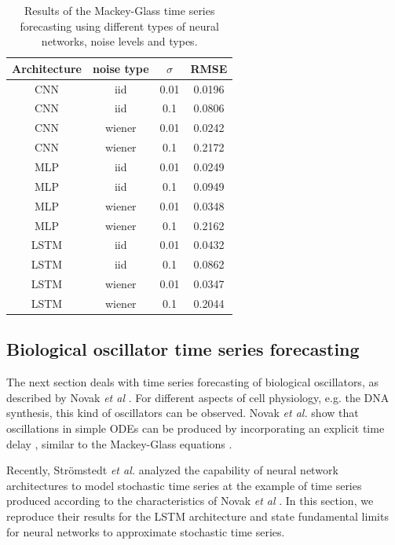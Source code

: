 \documentclass{article}
\begin{document}
\begin{table}
    \centering
    \begin{tabular}{c|c|c|c}
        Architecture & noise type & $\sigma$ & RMSE   \\
        \hline
        CNN          & iid        & 0.01     & 0.0196 \\
        CNN          & iid        & 0.1      & 0.0806 \\
        CNN          & wiener     & 0.01     & 0.0242 \\
        CNN          & wiener     & 0.1      & 0.2172 \\
        MLP          & iid        & 0.01     & 0.0249 \\
        MLP          & iid        & 0.1      & 0.0949 \\
        MLP          & wiener     & 0.01     & 0.0348 \\
        MLP          & wiener     & 0.1      & 0.2162 \\
        LSTM         & iid        & 0.01     & 0.0432 \\
        LSTM         & iid        & 0.1      & 0.0862 \\
        LSTM         & wiener     & 0.01     & 0.0347 \\
        LSTM         & wiener     & 0.1      & 0.2044 \\
    \end{tabular}
    \caption{Results of the Mackey-Glass time series forecasting using different
        types of neural networks, noise levels and types.}
    \label{tab:mackey_noise}
\end{table}

\subsection{Biological oscillator time series forecasting}

The next section deals with time series forecasting of biological oscillators,
as described by Novak \textit{et al} \cite{novak2008}. For different aspects of
cell physiology, e.g. the DNA synthesis, this kind of oscillators can be
observed. Novak \textit{et al.} show that oscillations in simple ODEs can be
produced by incorporating an explicit time delay \cite{novak2008}, similar to
the Mackey-Glass equations \cite{mackey1977}.

Recently, Strömstedt \textit{et al.} analyzed the capability of neural network
architectures to model stochastic time series \cite{stroemstedt2018} at the
example of time series produced according to the characteristics of Novak
\textit{et al} \cite{novak2008}. In this section, we reproduce their results for
the LSTM architecture and state fundamental limits for neural networks to
approximate stochastic time series.
\end{document}
